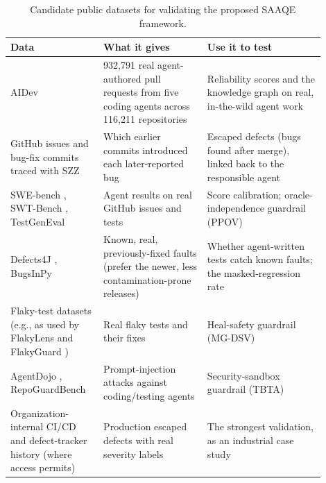 \begin{table}[t]
\caption{Candidate public datasets for validating the proposed SAAQE
framework.}
\label{tab:saaqe-data}
\begin{tabular}{p{0.26\linewidth}p{0.3\linewidth}p{0.34\linewidth}}
\toprule
Data & What it gives & Use it to test \\
\midrule
AIDev \cite{li2026aidev} &
932{,}791 real agent-authored pull requests from five coding agents
across 116{,}211 repositories &
Reliability scores and the knowledge graph on real, in-the-wild agent
work \\
GitHub issues and bug-fix commits traced with SZZ
\cite{sliwerski2005szz} &
Which earlier commits introduced each later-reported bug &
Escaped defects (bugs found after merge), linked back to the
responsible agent \\
SWE-bench \cite{jimenez2024swebench}, SWT-Bench \cite{slr0282024},
TestGenEval \cite{jain2024testgeneval} &
Agent results on real GitHub issues and tests &
Score calibration; oracle-independence guardrail (PPOV) \\
Defects4J \cite{just2014defects4j}, BugsInPy
\cite{widyasari2020bugsinpy} &
Known, real, previously-fixed faults (prefer the newer, less
contamination-prone releases) &
Whether agent-written tests catch known faults; the masked-regression
rate \\
Flaky-test datasets (e.g., as used by FlakyLens
\cite{slr0442025} and FlakyGuard \cite{slr0492025}) &
Real flaky tests and their fixes &
Heal-safety guardrail (MG-DSV) \\
AgentDojo \cite{debenedetti2024agentdojo}, RepoGuardBench
\cite{li2026repoguardbench} &
Prompt-injection attacks against coding/testing agents &
Security-sandbox guardrail (TBTA) \\
Organization-internal CI/CD and defect-tracker history (where access
permits) &
Production escaped defects with real severity labels &
The strongest validation, as an industrial case study \\
\bottomrule
\end{tabular}
\end{table}

